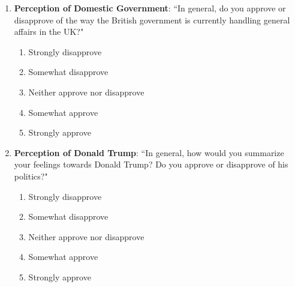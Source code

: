 \begin{appendices}
\begin{enumerate}
        \begin{enumerate}
        \item Strongly disagree
        \item Somewhat disagree
        \item Neither agree nor disagree
        \item Somewhat agree
        \item Strongly agree
        \end{enumerate}
    \item \textbf{Perception of Domestic Government}: ``In general, do you approve or disapprove of the way the British government is currently handling general affairs in the UK?"
        \begin{enumerate}
            \item Strongly disapprove
            \item Somewhat disapprove
            \item Neither approve nor disapprove
            \item Somewhat approve
            \item Strongly approve
        \end{enumerate}
    \item \textbf{Perception of Donald Trump}: ``In general, how would you summarize your feelings towards Donald Trump? Do you approve or disapprove of his politics?"
        \begin{enumerate}
            \item Strongly disapprove
            \item Somewhat disapprove
            \item Neither approve nor disapprove
            \item Somewhat approve
            \item Strongly approve 
        \end{enumerate}
    \end{enumerate}
    

\end{appendices}

